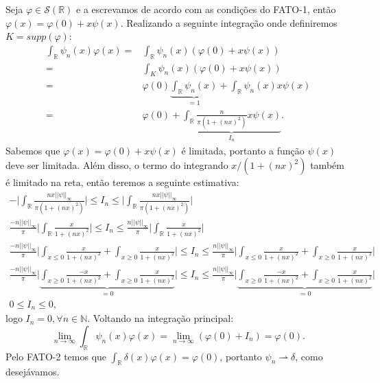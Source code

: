\documentclass{article}
\begin{document}
\begin{enumerate}
\begin{enumerate}
				
				
				Seja $\varphi \in \mathcal{S}(\mathbb{R})$ e a escrevamos de acordo com as condições do FATO-1, então $\varphi(x) = \varphi(0) + x\psi(x)$. Realizando a seguinte integração onde definiremos $K = supp(\varphi)$:
				$$
				\begin{aligned}
				\int_{\mathbb{R}} \psi_{n}(x)\varphi(x) = &\int_{\mathbb{R}} \psi_{n}(x)(\varphi(0) + x\psi(x)) 
				\\
				= &\int_{K} \psi_{n}(x)(\varphi(0) + x\psi(x)) 
				\\
				= & \varphi(0) \underbrace{ \int_{\mathbb{R}} \psi_{n}(x) } _{=1}  +  \int_{\mathbb{R}} \psi_{n}(x) x\psi(x) 
				\\
				= & \varphi(0)  +  \underbrace{ \int_{\mathbb{R}} \frac{n}{\pi(1+(nx)^{2})}  x\psi(x) }_{I_{n}} .
				\end{aligned}
				$$
				Sabemos que $\varphi(x) = \varphi(0) + x\psi(x)$ é limitada, portanto a função $\psi(x)$ deve ser limitada. Além disso, o termo do integrando $x/(1+(nx)^{2})$ também é limitado na reta, então teremos a seguinte estimativa:
				$$
				\begin{gathered}
				-\Big| \int_{\mathbb{R}}  \frac{n x ||\psi||_{\infty}}{\pi(1+(nx)^{2})} \Big| \leq  I_{n}	\leq \Big| \int_{\mathbb{R}} \frac{n x ||\psi||_{\infty}}{\pi(1+(nx)^{2})} \Big|
				\\
				\frac{-n||\psi||_{\infty}}{\pi} \Big| \int_{\mathbb{R}}  \frac{x}{1+(nx)^{2}} \Big| \leq  I_{n}	\leq  \frac{n||\psi||_{\infty}}{\pi} \Big| \int_{\mathbb{R}} \frac{x}{1+(nx)^{2}} \Big| 
				\\
				\frac{-n||\psi||_{\infty}}{\pi} \Big| \int_{x \leq 0} \frac{x}{1+(nx)^{2}} + \int_{x \geq 0} \frac{x}{1+(nx)^{2}} \Big| \leq  I_{n}	\leq  \frac{n||\psi||_{\infty}}{\pi} \Big| \int_{x \leq 0} \frac{x}{1+(nx)^{2}} + \int_{x \geq 0} \frac{x}{1+(nx)^{2}} \Big|
				\\
				\frac{-n||\psi||_{\infty}}{\pi} \Big| \underbrace{ \int_{x \geq 0} \frac{-x}{1+(nx)^{2}} + \int_{x \geq 0} \frac{x}{1+(nx)^{2}} }_{=0} \Big| \leq  I_{n}	\leq  \frac{n||\psi||_{\infty}}{\pi} \Big| \underbrace{ \int_{x \geq 0} \frac{-x}{1+(nx)^{2}} + \int_{x \geq 0} \frac{x}{1+(nx)^{2}} }_{=0} \Big| 
				\\
				0 \leq  I_{n}	\leq 0,
				\end{gathered} 
				$$
				logo $I_{n} = 0, \forall n \in \mathbb{N}$. Voltando na integração principal:
				$$
				\lim_{n \to \infty} \int_{\mathbb{R}} \psi_{n}(x)\varphi(x) = \lim_{n \to \infty} (\varphi(0) + I_{n}) = \varphi(0).
				$$
				Pelo FATO-2 temos que $\int_{\mathbb{R}} \delta(x) \varphi(x) = \varphi(0)$, portanto $\psi_{n} \rightharpoonup \delta$, como desejávamos.
			\end{enumerate}
	\end{enumerate}
	
	
\end{document}
